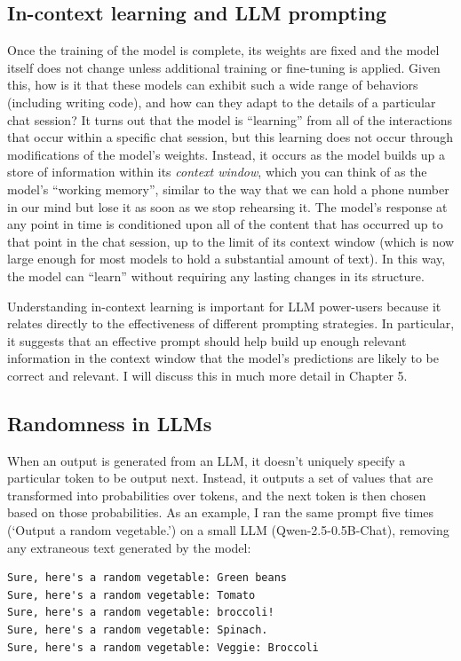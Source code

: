 \subsection{In-context learning and LLM prompting}

Once the training of the model is complete, its weights are fixed and the model itself does not change unless additional training or fine-tuning is applied.
Given this, how is it that these models can exhibit such a wide range of behaviors (including writing code), and how can they adapt to the details of a particular chat session? It turns out that the model is ``learning'' from all of the interactions that occur within a specific chat session, but this learning does not occur through modifications of the model's weights.
Instead, it occurs as the model builds up a store of information within its \textit{context window}, which you can think of as the model's ``working memory'', similar to the way that we can hold a phone number in our mind but lose it as soon as we stop rehearsing it.
The model's response at any point in time is conditioned upon all of the content that has occurred up to that point in the chat session, up to the limit of its context window (which is now large enough for most models to hold a substantial amount of text).
In this way, the model can ``learn'' without requiring any lasting changes in its structure.

Understanding in-context learning is important for LLM power-users because it relates directly to the effectiveness of different prompting strategies.
In particular, it suggests that an effective prompt should help build up enough relevant information in the context window that the model's predictions are likely to be correct and relevant.
I will discuss this in much more detail in Chapter 5.

\subsection{Randomness in LLMs}

When an output is generated from an LLM, it doesn't uniquely specify a particular token to be output next.
Instead, it outputs a set of values that are transformed into probabilities over tokens, and the next token is then chosen based on those probabilities.
As an example, I ran the same prompt five times (`Output a random vegetable.') on a small LLM (Qwen-2.5-0.5B-Chat), removing any extraneous text generated by the model:

\begin{lstlisting}[style=transcript]
Sure, here's a random vegetable: Green beans
Sure, here's a random vegetable: Tomato
Sure, here's a random vegetable: broccoli!
Sure, here's a random vegetable: Spinach.
Sure, here's a random vegetable: Veggie: Broccoli
\end{lstlisting}

